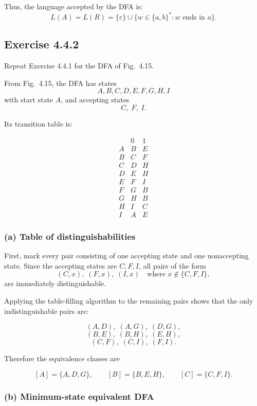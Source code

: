 \documentclass[11pt, a4paper]{article}
\theoremstyle{definition}
\theoremstyle{remark}
\begin{document}
Thus, the language accepted by the DFA is:
\[
L(A)=L(R)=\{\varepsilon\}\cup\{w\in\{a,b\}^* : w \text{ ends in } a\}.
\]

\subsection*{Exercise 4.4.2}

Repeat Exercise 4.4.1 for the DFA of Fig.\ 4.15.

From Fig.\ 4.15, the DFA has states
\[
A,B,C,D,E,F,G,H,I
\]
with start state \(A\), and accepting states
\[
C,\;F,\;I.
\]

Its transition table is:

\[
\begin{array}{c|cc}
   & 0 & 1 \\ \hline
A & B & E \\
B & C & F \\
C & D & H \\
D & E & H \\
E & F & I \\
F & G & B \\
G & H & B \\
H & I & C \\
I & A & E
\end{array}
\]

\subsubsection*{(a) Table of distinguishabilities}

First, mark every pair consisting of one accepting state and one nonaccepting state.  
Since the accepting states are \(C,F,I\), all pairs of the form
\[
(C,x),\;(F,x),\;(I,x)
\quad \text{where } x \notin \{C,F,I\},
\]
are immediately distinguishable.

Applying the table-filling algorithm to the remaining pairs shows that the only indistinguishable pairs are:

\[
(A,D),\;(A,G),\;(D,G),
\]
\[
(B,E),\;(B,H),\;(E,H),
\]
\[
(C,F),\;(C,I),\;(F,I).
\]

Therefore the equivalence classes are

\[
[A]=\{A,D,G\}, \qquad
[B]=\{B,E,H\}, \qquad
[C]=\{C,F,I\}.
\]

\subsubsection*{(b) Minimum-state equivalent DFA}
\end{document}
